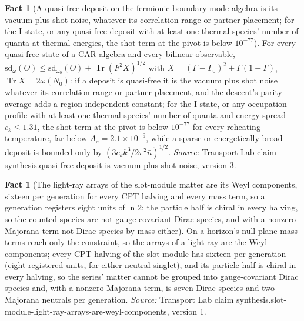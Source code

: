 \documentclass[11pt]{article}
\theoremstyle{definition}
\newtheorem{fact}[theorem]{Fact}
\theoremstyle{plain}
\providecommand{\Tr}{}\renewcommand{\Tr}{\operatorname{Tr}}
\begin{document}
\begin{fact}[A quasi-free deposit on the fermionic boundary-mode algebra is its vacuum plus shot noise, whatever its correlation range or partner placement; for the I-state, or any quasi-free deposit with at least one thermal species' number of quanta at thermal energies, the shot term at the pivot is below $10^{-77}$]\label{c:synthesis.quasi-free-deposit-is-vacuum-plus-shot-noise}
For every quasi-free state of a CAR algebra and every bilinear observable, $\mathrm{sd}_{\omega}(O) \le \mathrm{sd}_{\omega_{0}}(O) + \Tr(F^{2}X)^{1/2}$ with $X = (\Gamma - \Gamma_{0})^{2} + \Gamma(1 - \Gamma)$, $\Tr X = 2\omega(N_{0})$: if a deposit is quasi-free it is the vacuum plus shot noise whatever its correlation range or partner placement, and the descent's parity average adds a region-independent constant; for the I-state, or any occupation profile with at least one thermal species' number of quanta and energy spread $c_{k} \le 1.31$, the shot term at the pivot is below $10^{-77}$ for every reheating temperature, far below $A_{s} = 2.1 \times 10^{-9}$, while a sparse or energetically broad deposit is bounded only by $(3c_{k}k^{3}/2\pi^{2}\bar n)^{1/2}$.
\emph{Source:} Transport Lab claim synthesis.quasi-free-deposit-is-vacuum-plus-shot-noise, version 3.
\end{fact}

\begin{fact}[The light-ray arrays of the slot-module matter are its Weyl components, sixteen per generation for every CPT halving and every mass term, so a generation registers eight units of ln 2; the particle half is chiral in every halving, so the counted species are not gauge-covariant Dirac species, and with a nonzero Majorana term not Dirac species by mass either]\label{c:synthesis.slot-module-light-ray-arrays-are-weyl-components}
On a horizon's null plane mass terms reach only the constraint, so the arrays of a light ray are the Weyl components; every CPT halving of the slot module has sixteen per generation (eight registered units, for either neutral singlet), and its particle half is chiral in every halving, so the series' matter cannot be grouped into gauge-covariant Dirac species and, with a nonzero Majorana term, is seven Dirac species and two Majorana neutrals per generation.
\emph{Source:} Transport Lab claim synthesis.slot-module-light-ray-arrays-are-weyl-components, version 1.
\end{fact}
\end{document}
